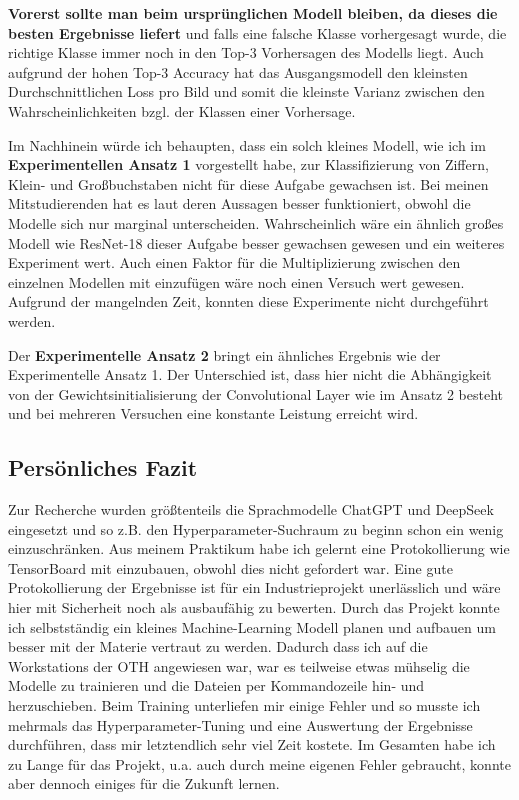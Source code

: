 \documentclass[12pt,oneside]{article}
\begin{document}
	\textbf{Vorerst sollte man beim ursprünglichen Modell bleiben, da dieses die besten Ergebnisse liefert} und falls eine falsche Klasse vorhergesagt wurde, die richtige Klasse immer noch in den Top-3 Vorhersagen des Modells liegt. Auch aufgrund der hohen Top-3 Accuracy hat das Ausgangsmodell den kleinsten Durchschnittlichen Loss pro Bild und somit die kleinste Varianz zwischen den Wahrscheinlichkeiten bzgl. der Klassen einer Vorhersage.
  
  Im Nachhinein würde ich behaupten, dass ein solch kleines Modell, wie ich im \textbf{Experimentellen Ansatz 1} vorgestellt habe, zur Klassifizierung von Ziffern, Klein- und Großbuchstaben nicht für diese Aufgabe gewachsen ist. Bei meinen Mitstudierenden hat es laut deren Aussagen besser funktioniert, obwohl die Modelle sich nur marginal unterscheiden. Wahrscheinlich wäre ein ähnlich großes Modell wie ResNet-18 dieser Aufgabe besser gewachsen gewesen und ein weiteres Experiment wert. Auch einen Faktor für die Multiplizierung zwischen den einzelnen Modellen mit einzufügen wäre noch einen Versuch wert gewesen. Aufgrund der mangelnden Zeit, konnten diese Experimente nicht durchgeführt werden. 
  
  Der \textbf{Experimentelle Ansatz 2} bringt ein ähnliches Ergebnis wie der Experimentelle Ansatz 1. Der Unterschied ist, dass hier nicht die Abhängigkeit von der Gewichtsinitialisierung der Convolutional Layer wie im Ansatz 2 besteht und bei mehreren Versuchen eine konstante Leistung erreicht wird. 
  
  \subsection{Persönliches Fazit}
  Zur Recherche wurden größtenteils die Sprachmodelle ChatGPT \cite{noauthor_chatgpt_nodate} und DeepSeek \cite{noauthor_deepseek_nodate} eingesetzt und so z.B. den Hyperparameter-Suchraum zu beginn schon ein wenig einzuschränken. 
  Aus meinem Praktikum habe ich gelernt eine Protokollierung wie TensorBoard mit einzubauen, obwohl dies nicht gefordert war. Eine gute Protokollierung der Ergebnisse ist für ein Industrieprojekt unerlässlich und wäre hier mit Sicherheit noch als ausbaufähig zu bewerten. 
  Durch das Projekt konnte ich selbstständig ein kleines Machine-Learning Modell planen und aufbauen um besser mit der Materie vertraut zu werden. Dadurch dass ich auf die Workstations der OTH angewiesen war, war es teilweise etwas mühselig die Modelle zu trainieren und die Dateien per Kommandozeile hin- und herzuschieben. Beim Training unterliefen mir einige Fehler und so musste ich mehrmals das Hyperparameter-Tuning und eine Auswertung der Ergebnisse durchführen, dass mir letztendlich sehr viel Zeit kostete. Im Gesamten habe ich zu Lange für das Projekt, u.a. auch durch meine eigenen Fehler gebraucht, konnte aber dennoch einiges für die Zukunft lernen. 
\end{document}
